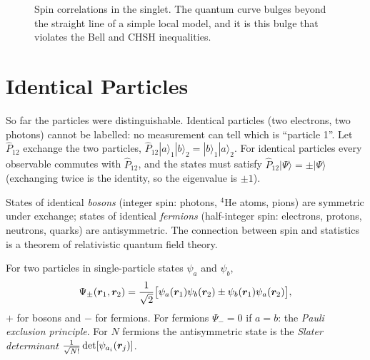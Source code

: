 \begin{figure}[ht]
\centering
{}
\caption{Spin correlations in the singlet. The quantum curve bulges beyond the straight line of a simple local model, and it is this bulge that violates the Bell and CHSH inequalities.}
\end{figure}

\section{Identical Particles}

So far the particles were distinguishable. Identical particles (two electrons, two photons) cannot be labelled: no measurement can tell which is ``particle 1''. Let $\hat{P}_{12}$ exchange the two particles, $\hat{P}_{12}|a\rangle_1|b\rangle_2 = |b\rangle_1|a\rangle_2$. For identical particles every observable commutes with $\hat{P}_{12}$, and the states must satisfy $\hat{P}_{12}|\Psi\rangle = \pm|\Psi\rangle$ (exchanging twice is the identity, so the eigenvalue is $\pm1$).

\begin{fact}
States of identical \emph{bosons} (integer spin: photons, $^4$He atoms, pions) are symmetric under exchange; states of identical \emph{fermions} (half-integer spin: electrons, protons, neutrons, quarks) are antisymmetric. The connection between spin and statistics is a theorem of relativistic quantum field theory.
\end{fact}

For two particles in single-particle states $\psi_a$ and $\psi_b$,
\[
    \Psi_\pm(\bm{r}_1,\bm{r}_2) = \frac{1}{\sqrt2}\bigl[\psi_a(\bm{r}_1)\psi_b(\bm{r}_2)\pm\psi_b(\bm{r}_1)\psi_a(\bm{r}_2)\bigr],
\]
$+$ for bosons and $-$ for fermions. For fermions $\Psi_- = 0$ if $a = b$: the \emph{Pauli exclusion principle}. For $N$ fermions the antisymmetric state is the \emph{Slater determinant} $\frac{1}{\sqrt{N!}}\det[\psi_{a_i}(\bm{r}_j)]$.

